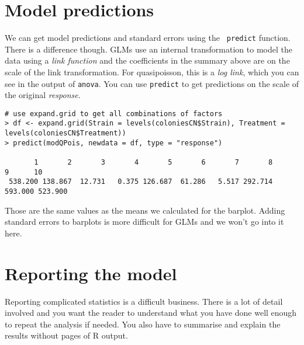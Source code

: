 \section{Model predictions}

We can get model predictions and standard errors using the {\tt 
predict} function. There is a difference though. GLMs use an internal 
transformation to model the data using a {\it link function} and the 
coefficients in the summary above are on the scale of the link 
transformation. For quasipoisson, this is a {\it log link}, which you 
can see in the output of {\tt anova}. You can use {\tt predict} to get 
predictions on the scale of the original {\it response}.

\begin{lstlisting}
# use expand.grid to get all combinations of factors
> df <- expand.grid(Strain = levels(coloniesCN$Strain), Treatment =
levels(coloniesCN$Treatment))
> predict(modQPois, newdata = df, type = "response")

       1       2       3       4       5       6       7       8       9      10 
 538.200 138.867  12.731   0.375 126.687  61.286   5.517 292.714 593.000 523.900 
\end{lstlisting}

Those are the same values as the means we calculated for the barplot. 
Adding standard errors to barplots is more difficult for GLMs and we 
won't go into it here.

\section{Reporting the model}

Reporting complicated statistics is a difficult business. There is a 
lot of detail involved and you want the reader to understand what you 
have done well enough to repeat the analysis if needed. You also have 
to summarise and explain the results without pages of R output. 

